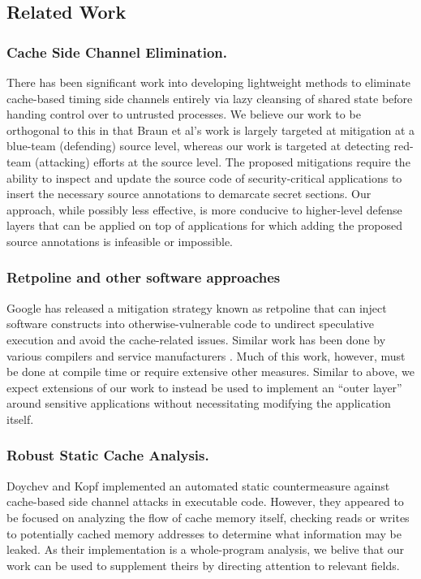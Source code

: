 \documentclass[12pt]{article}
\begin{document}
\begin{multicols*}{2}
  \section{Related Work}

  \subsubsection*{Cache Side Channel Elimination.}

  There has been significant work into
  developing lightweight methods to eliminate cache-based timing side channels
  entirely via lazy cleansing of shared state before handing control over to
  untrusted processes\cite{lcache}. We believe our work to be orthogonal to
  this in that Braun et al's work is largely targeted at mitigation at a
  blue-team (defending) source level, whereas our work is targeted at detecting
  red-team (attacking) efforts at the source level. The proposed  mitigations
  require the ability to inspect and update the source code of
  security-critical applications to insert the necessary source annotations to
  demarcate secret sections. Our approach, while possibly less effective, is
  more conducive to higher-level defense layers that can be applied on top of
  applications for which adding the proposed source annotations is infeasible
  or impossible.

  \subsubsection*{Retpoline and other software approaches}

  Google has released a mitigation strategy known as retpoline\cite{retpoline}
  that can inject software constructs into otherwise-vulnerable code to
  undirect speculative execution and avoid the cache-related issues. Similar
  work has been done by various compilers and service manufacturers\cite{gcc}
  \cite{msft}. Much of this work, however, must be done at compile time or
  require extensive other measures. Similar to above, we expect extensions of
  our work to instead be used to implement an ``outer layer'' around sensitive
  applications without necessitating modifying the application itself.

  \subsubsection*{Robust Static Cache Analysis.}

  Doychev and Kopf implemented an automated static countermeasure against
  cache-based side channel attacks in executable code\cite{rigor}. However,
  they appeared to be focused on analyzing the flow of cache memory itself,
  checking reads or writes to potentially cached memory addresses to determine
  what information may be leaked. As their implementation is a whole-program
  analysis, we belive that our work can be used to supplement theirs by
  directing attention to relevant fields.


\end{multicols*}
\end{document}

